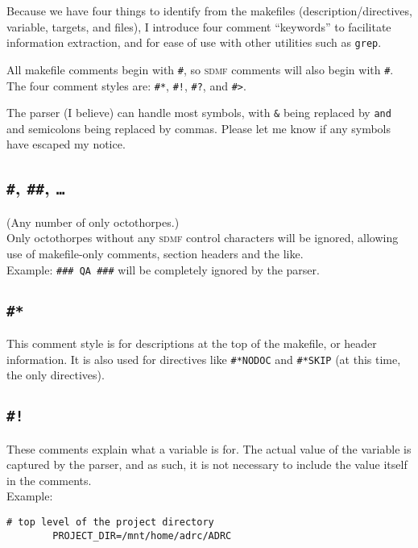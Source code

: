 \documentclass[oneside,11pt]{article}
\newcommand{\sdmf}{\textsc{sdmf}}
\begin{document}
	Because we have four things to identify from the makefiles (description/directives, variable, targets, and files), I introduce four comment ``keywords'' to facilitate information extraction, and for ease of use with other utilities such as \texttt{grep}.
	
	All makefile comments begin with \texttt{\#}, so \sdmf{} comments will also begin with \texttt{\#}. The four comment styles are: \texttt{\#*}, \texttt{\#!}, \texttt{\#?}, and \texttt{\#>}.
	
	The parser (I believe) can handle most symbols, with \texttt{\&} being replaced by \texttt{and} and semicolons being replaced by commas. Please let me know if any symbols have escaped my notice.
	
	\subsection{\texttt{\#}, \texttt{\#\#}, \texttt{\ldots}}
	
	(Any number of only octothorpes.) \\ Only octothorpes without any \sdmf{} control characters will be ignored, allowing use of  makefile-only comments, section headers and the like. \\ Example: \texttt{\#\#\# QA \#\#\#} will be completely ignored by the parser.
	
	\subsection{\texttt{\#*}}
	
	This comment style is for descriptions at the top of the makefile, or header information. It is also used for directives like \texttt{\#*NODOC} and \texttt{\#*SKIP} (at this time, the only directives).
	
	\subsection{\texttt{\#!}}
	
	These comments explain what a variable is for. The actual value of the variable is captured by the parser, and as such, it is not necessary to include the value itself in the comments. \\
	Example: 
	\begin{lstlisting}[gobble=16, basicstyle=\ttfamily]
		# top level of the project directory
		PROJECT_DIR=/mnt/home/adrc/ADRC 
	\end{lstlisting}
	
\end{document}
